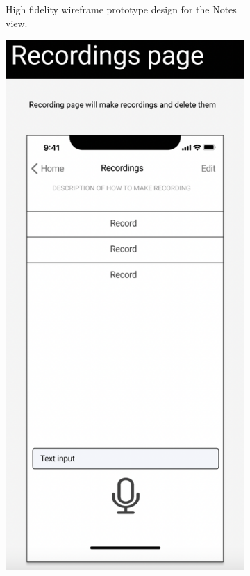 \documentclass{l4proj}
\begin{document}
\begin{appendices}
\begin{figure}[H]
\begin{subfigure}[b]{0.3\textwidth}
        \caption{High fidelity wireframe prototype design for the Notes view.}
        \label{fig:NotesWireframe}
    \end{subfigure}   
    \begin{subfigure}[b]{0.3\textwidth}
        \includegraphics[scale=0.3]{images/RecordingsWireframe.pdf}

\end{subfigure}
\end{figure}
\end{appendices}
\end{document}
